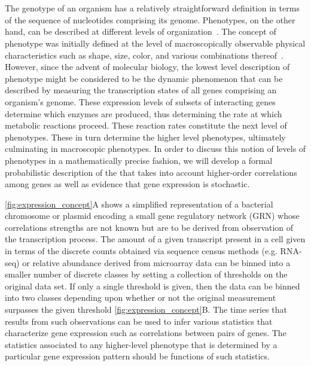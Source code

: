 
\section{\gnpm{}}
The genotype of an organism has a relatively straightforward definition in terms of the sequence of nucleotides comprising its genome. Phenotypes, on the other hand, can be described at different levels of organization~\cite{Dawkins1982,Stadler2001}. The concept of phenotype was initially defined at the level of macroscopically observable physical characteristics such as shape, size, color, and various combinations thereof~\cite{Johannsen1911}. However, since the advent of molecular biology, the lowest level description of phenotype might be considered to be the dynamic phenomenon that can be described by measuring the transcription states of all genes comprising an organism's genome.  These expression levels of subsets of interacting genes determine which enzymes are produced, thus determining the rate at which metabolic reactions proceed.  These reaction rates constitute the next level of phenotypes.  These in turn determine the higher level phenotypes, ultimately culminating in macroscopic phenotypes.  In order to discuss this notion of levels of phenotypes in a mathematically precise fashion, we will develop a formal probabilistic description of the \gnpm{} that takes into account higher-order correlations among genes as well as evidence that gene expression is stochastic.

\ref{fig:expression_concept}A shows a simplified representation of a bacterial chromosome or plasmid encoding a small gene regulatory network (GRN) whose correlations strengths are not known but are to be derived from observation of the transcription process. The amount of a given transcript present in a cell given in terms of the discrete counts obtained via sequence census methods (e.g. RNA-seq) or relative abundance derived from microarray data can be binned into a smaller number of discrete classes by setting a collection of thresholds on the original data set. If only a single threshold is given, then the data can be binned into two classes depending upon whether or not the original measurement surpasses the given threshold \ref{fig:expression_concept}B.
The time series that results from such observations can be used to infer various statistics that characterize gene expression such as correlations between pairs of genes. The statistics associated to any higher-level phenotype that is determined by a particular gene expression pattern should be functions of such statistics.

